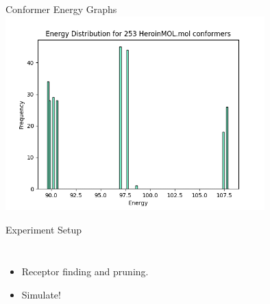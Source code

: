 \documentclass{beamer}
\begin{document}
\begin{frame}{Conformer Energy Graphs}
\includegraphics[width=10cm]{img/Graphs/HeroinMOL_Energy_Histogram.png}
\end{frame}

\begin{frame}{Experiment Setup}
    \begin{columns}
            \begin{itemize}
            \item Receptor finding and pruning.
            \item Simulate!
      \end{itemize}
    \end{columns}
\end{frame}

\end{document}
